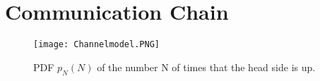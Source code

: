 \chapter{Communication Chain} \label{chap:commchain}
\graphicspath{{C:/Users/Kevin/Bachelarbeit/Bachelorarbeit/01_Bachelorarbeit_LaTex/02_Figures/}}

\begin{figure}[!htb]
    \centering
    \texttt{[image: Channelmodel.PNG]}
    \caption{PDF $p_N(N)$ of the number N of times that the head side is up.}
    \label{fig:coin_bino}
\end{figure}



\clearpage
